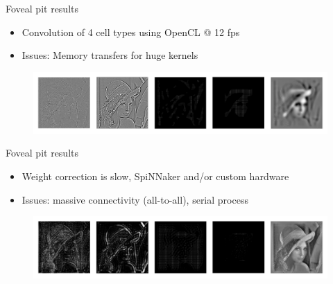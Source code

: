 \documentclass[17pt,mathserif]{beamer}
\begin{document}
    \begin{frame}{Foveal pit results}
      \vspace*{-4em}
      \begin{itemize}
        \item Convolution of 4 cell types using OpenCL @ 12 fps
        \item Issues: Memory transfers for huge kernels
      \end{itemize}
      \vspace*{-1em}
      \begin{figure}
        \includegraphics[width=\textwidth]{conv-imgs}
      \end{figure}
    \end{frame}
    \begin{frame}{Foveal pit results}
      \vspace*{-3em}
      \begin{itemize}
        \item Weight correction is slow, SpiNNaker and/or custom hardware
        \item Issues: massive connectivity (all-to-all), serial process
      \end{itemize}
      \vspace*{-1em}
      \begin{figure}
        \includegraphics[width=\textwidth]{focal-imgs}
      \end{figure}
    \end{frame}
\end{document}
